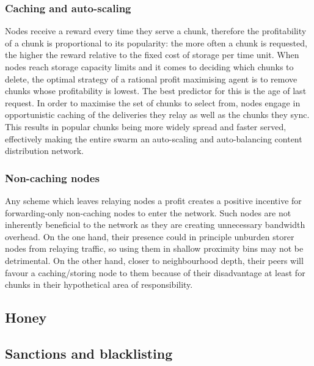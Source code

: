 \subsubsection{Caching and auto-scaling}\label{sec:caching}

Nodes receive a reward every time they serve a chunk, therefore the profitability of a chunk is proportional to its popularity: the more often a chunk is requested, the higher the reward relative to the fixed cost of storage per time unit. When nodes reach storage capacity limits and it comes to deciding which chunks to delete, the optimal strategy of a rational profit maximising agent is to remove chunks whose profitability is lowest. The best predictor for this is the age of last request. In order to maximise the set of chunks to select from, nodes engage in opportunistic caching of the deliveries they relay as well as the chunks they sync. This results in popular chunks being more widely spread and faster served, effectively making the entire swarm an auto-scaling and auto-balancing content distribution network.


\subsubsection{Non-caching nodes}

Any scheme which leaves relaying nodes a profit creates a positive incentive for forwarding-only non-caching nodes to enter the network. Such nodes are not inherently beneficial to the network as they are creating unnecessary bandwidth overhead. On the one hand, their presence could in principle unburden storer nodes from relaying traffic, so using them in shallow proximity bins may not be detrimental. On the other hand, closer to neighbourhood depth, their peers will favour a caching/storing node to them because of their disadvantage at least for chunks in their hypothetical area of responsibility.


\subsection{Honey}\label{sec:honey}


\subsection{Sanctions and blacklisting}\label{sec:sanctions}

